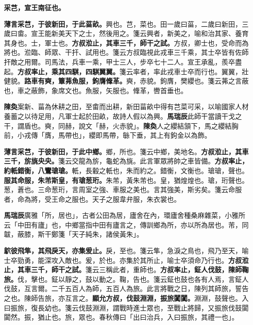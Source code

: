 
\textbf{采芑，宣王南征也。}

\textbf{薄言采芑，于彼新田，于此菑畝。}{\footnotesize 興也。芑，菜也。田一歲曰菑，二歲曰新田，三歲曰畬。宣王能新美天下之士，然後用之。箋云興者，新美之，喻和治其家、養育其身也。士，軍士也。}\textbf{方叔涖止，其車三千，師干之試。}{\footnotesize 方叔，卿士也，受命而為將也。涖臨、師眾、干扞、試用也。箋云方叔臨視此戎車三千乘，其士卒皆有佐師扞敵之用爾。司馬法，兵車一乘，甲士三人，步卒七十二人。宣王承亂，羨卒盡起。}\textbf{方叔率止，乘其四騏，四騏翼翼。}{\footnotesize 箋云率者，率此戎車士卒而行也。翼翼，壯健貌。}\textbf{路車有奭，簟茀魚服，鉤膺鞗革。}{\footnotesize 奭，赤貌。鉤膺，樊纓也。箋云茀之言蔽也，車之蔽飾，象席文也。魚服，矢服也。鞗革，轡首垂也。}

\begin{quoting}\textbf{陳奐}案新、菑為休耕之田，至畬而出耕，新田菑畝中得有芑菜可采，以喻國家人材養蓄之以待足用，凡軍士起於田畝，故詩人假以為興。\textbf{馬瑞辰}此師干當讀干戈之干，謂盾也。奭，同赫，說文「赫，火赤貌」。\textbf{陳奐}人之纓結頷下，馬之纓結胸前，小戎傳「膺，馬帶也」，纓即馬帶，䋣下垂，其上有鉤金以為飾。\end{quoting}

\textbf{薄言采芑，于彼新田，于此中鄉。}{\footnotesize 鄉，所也。箋云中鄉，美地名。}\textbf{方叔涖止，其車三千，旂旐央央。}{\footnotesize 箋云交龍為旂，龜蛇為旐。此言軍眾將帥之車皆備。}\textbf{方叔率止，約軝錯衡，八鸞瑲瑲。}{\footnotesize 軝，長轂之軝也，朱而約之。錯衡，文衡也。瑲瑲，聲也。}\textbf{服其命服，朱芾斯皇，有瑲葱珩。}{\footnotesize 朱芾，黃朱芾也。皇，猶煌煌也。瑲，珩聲也。葱，蒼也。三命葱珩，言周室之強、車服之美也。言其強美，斯劣矣。箋云命服者，命為將，受王命之服也。天子之服韋弁服，朱衣裳也。}

\begin{quoting}\textbf{馬瑞辰}廣雅「所，居也」，古者公田為居，廬舍在內，環廬舍種桑麻雜菜，小雅所云「中田有廬」也，中鄉當指中田有廬言之，傳訓鄉為所，亦以所為居也。芾，同韍，蔽膝，斯干鄭箋「天子純朱，諸侯黃朱」。\end{quoting}

\textbf{鴥彼飛隼，其飛戾天，亦集爰止。}{\footnotesize 戾，至也。箋云隼，急淚之鳥也，飛乃至天，喻士卒勁勇，能深攻入敵也。爰，於也。亦集於其所止，喻士卒須命乃行也。}\textbf{方叔涖止，其車三千，師干之試。}{\footnotesize 箋云三稱此者，重師也。}\textbf{方叔率止，鉦人伐鼓，陳師鞠旅。}{\footnotesize 伐，擊也。鉦以靜之，鼓以動之。鞠，告也。箋云鉦也鼓也各有人焉，言鉦人伐鼓，互言爾。二千五百人為師，五百人為旅。此言將戰之日，陳列其師旅，誓告之也。陳師告旅，亦互言之。}\textbf{顯允方叔，伐鼓淵淵，振旅闐闐。}{\footnotesize 淵淵，鼓聲也。入曰振旅，復長幼也。箋云伐鼓淵淵，謂戰時進士眾也，至戰止將歸，又振旅伐鼓闐闐然。振，猶止也。旅，眾也。春秋傳曰「出曰治兵，入曰振旅，其禮一也」。}

